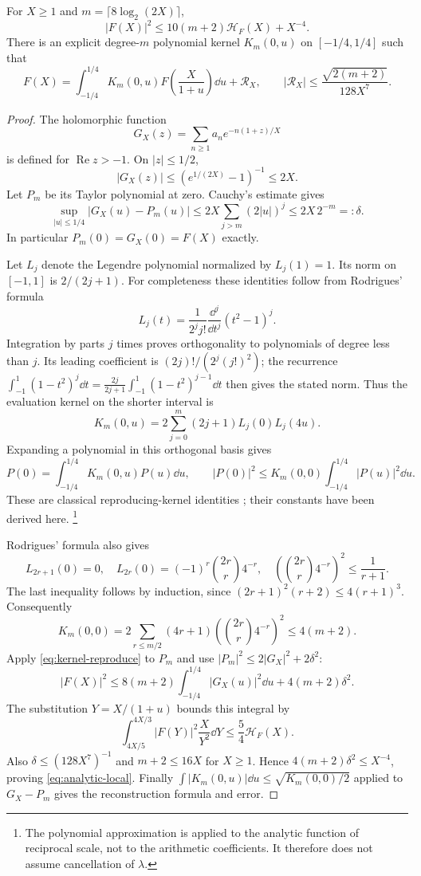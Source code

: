 \begin{theorem}\label{thm:analytic-local}
For \(X\ge1\) and \(m=\lceil8\log_2(2X)\rceil\),
\begin{equation}\label{eq:analytic-local}
 |F(X)|^2\le10(m+2)\mathcal H_F(X)+X^{-4}.
\end{equation}
There is an explicit degree-\(m\) polynomial kernel \(K_m(0,u)\)
on \([-1/4,1/4]\) such that
\[
 F(X)=\int_{-1/4}^{1/4}K_m(0,u)
             F\!\left(\frac X{1+u}\right)\dd u+\mathcal R_X,
 \qquad
 |\mathcal R_X|\le\frac{\sqrt{2(m+2)}}{128X^7}.
\]
\end{theorem}
\begin{proof}
The holomorphic function
\[
 G_X(z)=\sum_{n\ge1}a_ne^{-n(1+z)/X}
\]
is defined for \(\operatorname{Re}z>-1\). On \(|z|\le1/2\),
\[
 |G_X(z)|\le(e^{1/(2X)}-1)^{-1}\le2X.
\]
Let \(P_m\) be its Taylor polynomial at zero. Cauchy's estimate gives
\[
 \sup_{|u|\le1/4}|G_X(u)-P_m(u)|
 \le2X\sum_{j>m}(2|u|)^j
 \le2X\,2^{-m}=:\delta.
\]
In particular \(P_m(0)=G_X(0)=F(X)\) exactly.

Let \(L_j\) denote the Legendre polynomial normalized by \(L_j(1)=1\).
Its norm on \([-1,1]\) is \(2/(2j+1)\). For completeness these
identities follow from Rodrigues' formula
\[
 L_j(t)=\frac1{2^j j!}\frac{\dd^j}{\dd t^j}(t^2-1)^j.
\]
Integration by parts \(j\) times proves orthogonality to polynomials
of degree less than \(j\). Its leading coefficient is
\((2j)!/(2^j(j!)^2)\); the recurrence
\(\int_{-1}^1(1-t^2)^j\dd t
 =\frac{2j}{2j+1}\int_{-1}^1(1-t^2)^{j-1}\dd t\)
then gives the stated norm.
Thus the evaluation kernel on the shorter interval is
\[
 K_m(0,u)=2\sum_{j=0}^m(2j+1)L_j(0)L_j(4u).
\]
Expanding a polynomial in this orthogonal basis gives
\begin{equation}\label{eq:kernel-reproduce}
 P(0)=\int_{-1/4}^{1/4}K_m(0,u)P(u)\dd u,\qquad
 |P(0)|^2\le K_m(0,0)\int_{-1/4}^{1/4}|P(u)|^2\dd u.
\end{equation}
These are classical reproducing-kernel identities
\cite[\S18.2(v)]{dlmf}; their constants have been derived here.
\footnote{The polynomial approximation is applied to the analytic
function of reciprocal scale, not to the arithmetic coefficients.
It therefore does not assume cancellation of \(\lambda\).}

Rodrigues' formula also gives
\[
 L_{2r+1}(0)=0,\quad
 L_{2r}(0)=(-1)^r\binom{2r}{r}4^{-r},\quad
 \left(\binom{2r}{r}4^{-r}\right)^2\le\frac1{r+1}.
\]
The last inequality follows by induction, since
\((2r+1)^2(r+2)\le4(r+1)^3\). Consequently
\[
 K_m(0,0)
 =2\sum_{r\le m/2}(4r+1)
      \left(\binom{2r}{r}4^{-r}\right)^2
 \le4(m+2).
\]
Apply \eqref{eq:kernel-reproduce} to \(P_m\) and use
\(|P_m|^2\le2|G_X|^2+2\delta^2\):
\[
 |F(X)|^2\le8(m+2)\int_{-1/4}^{1/4}|G_X(u)|^2\dd u
             +4(m+2)\delta^2.
\]
The substitution \(Y=X/(1+u)\) bounds this integral by
\[
 \int_{4X/5}^{4X/3}|F(Y)|^2\frac X{Y^2}\dd Y
 \le\frac54\mathcal H_F(X).
\]
Also \(\delta\le(128X^7)^{-1}\) and \(m+2\le16X\) for \(X\ge1\).
Hence \(4(m+2)\delta^2\le X^{-4}\), proving
\eqref{eq:analytic-local}. Finally
\(\int|K_m(0,u)|\dd u\le\sqrt{K_m(0,0)/2}\)
applied to \(G_X-P_m\) gives the reconstruction formula and error.
\end{proof}

